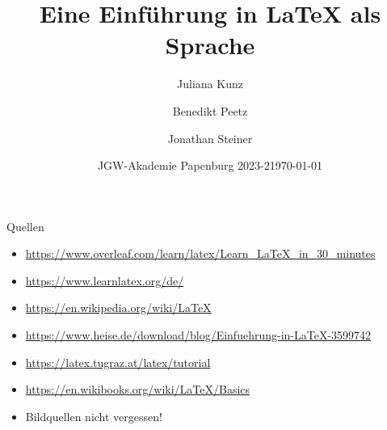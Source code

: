 \documentclass{beamer}
\title[\LaTeX{} Einführung]{Eine Einführung in \LaTeX{} als Sprache}
\author[Juliana, Benedikt, Jonathan]{Juliana Kunz \and Benedikt Peetz \and Jonathan Steiner}
\date[JGW 2023-2]{JGW-Akademie Papenburg 2023-2}
\date{\today}
\begin{document}
    \maketitle

    
    
    

    \begin{frame}{Quellen}

        \scriptsize

        \begin{itemize}
            \item \url{https://www.overleaf.com/learn/latex/Learn_LaTeX_in_30_minutes}
            \item \url{https://www.learnlatex.org/de/}
            \item \url{https://en.wikipedia.org/wiki/LaTeX}
            \item \url{https://www.heise.de/download/blog/Einfuehrung-in-LaTeX-3599742}
            \item \url{https://latex.tugraz.at/latex/tutorial}
            \item \url{https://en.wikibooks.org/wiki/LaTeX/Basics}
            \item Bildquellen nicht vergessen!
        \end{itemize}
    \end{frame}
\end{document}
